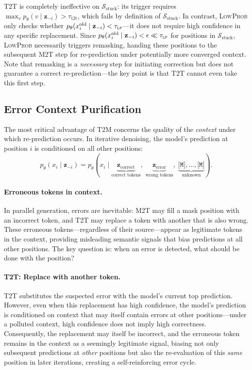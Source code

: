 \documentclass{article}
\newcommand{\mask}{\texttt{[M]}}
\newcommand{\MtoT}{\textrm{M2T}}
\newcommand{\TtoT}{\textrm{T2T}}
\newcommand{\TtoM}{\textrm{T2M}}
\newcommand{\Sstuck}{\mathcal{S}_{\mathrm{stuck}}}
\newcommand{\xold}{x_i^{\mathrm{old}}}
\begin{document}
\noindent \TtoT{} is completely ineffective on $\Sstuck$: its trigger requires $\max_v p_\theta(v \mid \mathbf{z}_{-i}) > \tau_{\text{t2t}}$, which fails by definition of $\Sstuck$. In contrast, \textsc{LowProb} only checks whether $p_\theta(\xold \mid \mathbf{z}_{-i}) < \tau_{\textsc{lp}}$---it does not require high confidence in any specific replacement. Since $p_\theta(\xold \mid \mathbf{z}_{-i}) < \epsilon \ll \tau_{\textsc{lp}}$ for positions in $\Sstuck$, \textsc{LowProb} necessarily triggers remasking, handing these positions to the subsequent \MtoT{} step for re-prediction under potentially more converged context. Note that remasking is a \emph{necessary} step for initiating correction but does not guarantee a correct re-prediction---the key point is that \TtoT{} cannot even take this first step.

\subsection{Error Context Purification}

The most critical advantage of \TtoM{} concerns the quality of the \emph{context} under which re-prediction occurs. In iterative denoising, the model's prediction at position $i$ is conditioned on all other positions:
\begin{equation}
    p_\theta(x_i \mid \mathbf{z}_{-i}) = p_\theta\!\left(x_i \mid \underbrace{\mathbf{z}_{\text{correct}}}_{\text{correct tokens}},\; \underbrace{\mathbf{z}_{\text{error}}}_{\text{wrong tokens}},\; \underbrace{\mask{}, \ldots, \mask{}}_{\text{unknown}}\right).
\end{equation}

\paragraph{Erroneous tokens in context.} In parallel generation, errors are inevitable: \MtoT{} may fill a mask position with an incorrect token, and \TtoT{} may replace a token with another that is also wrong. These erroneous tokens---regardless of their source---appear as legitimate tokens in the context, providing misleading semantic signals that bias predictions at all other positions. The key question is: when an error is detected, what should be done with the position?

\paragraph{T2T: Replace with another token.} \TtoT{} substitutes the suspected error with the model's current top prediction. However, even when this replacement has high confidence, the model's prediction is conditioned on context that may itself contain errors at other positions---under a polluted context, high confidence does not imply high correctness. Consequently, the replacement may itself be incorrect, and the erroneous token remains in the context as a seemingly legitimate signal, biasing not only subsequent predictions at \emph{other} positions but also the re-evaluation of this \emph{same} position in later iterations, creating a self-reinforcing error cycle.
\end{document}
